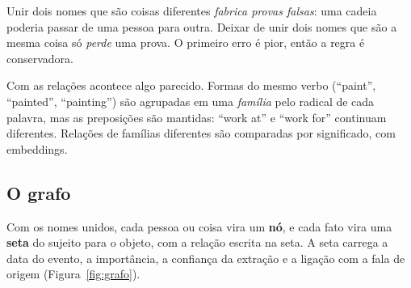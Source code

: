 \documentclass[11pt]{article}
\begin{document}
\begin{porque}
Unir dois nomes que são coisas diferentes \emph{fabrica provas falsas}: uma
cadeia poderia passar de uma pessoa para outra. Deixar de unir dois nomes que
são a mesma coisa só \emph{perde} uma prova. O primeiro erro é pior, então a
regra é conservadora.
\end{porque}

Com as relações acontece algo parecido. Formas do mesmo verbo (``paint'',
``painted'', ``painting'') são agrupadas em uma \emph{família} pelo radical de
cada palavra, mas as preposições são mantidas: ``work at'' e ``work for''
continuam diferentes. Relações de famílias diferentes são comparadas por
significado, com embeddings.

\subsection{O grafo}

Com os nomes unidos, cada pessoa ou coisa vira um \textbf{nó}, e cada fato vira
uma \textbf{seta} do sujeito para o objeto, com a relação escrita na seta. A
seta carrega a data do evento, a importância, a confiança da extração e a
ligação com a fala de origem (Figura~\ref{fig:grafo}).
\end{document}

